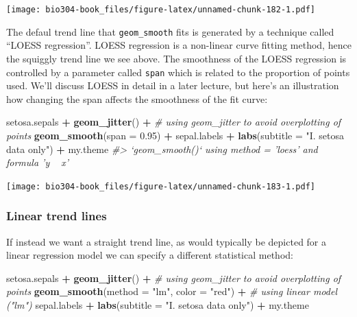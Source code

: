 \documentclass[]{book}
\newenvironment{Shaded}{\begin{snugshade}}{\end{snugshade}}
\newcommand{\CommentTok}[1]{\textcolor[rgb]{0.56,0.35,0.01}{\textit{#1}}}
\newcommand{\DataTypeTok}[1]{\textcolor[rgb]{0.13,0.29,0.53}{#1}}
\newcommand{\FloatTok}[1]{\textcolor[rgb]{0.00,0.00,0.81}{#1}}
\newcommand{\KeywordTok}[1]{\textcolor[rgb]{0.13,0.29,0.53}{\textbf{#1}}}
\newcommand{\NormalTok}[1]{#1}
\newcommand{\OperatorTok}[1]{\textcolor[rgb]{0.81,0.36,0.00}{\textbf{#1}}}
\newcommand{\StringTok}[1]{\textcolor[rgb]{0.31,0.60,0.02}{#1}}
\theoremstyle{definition}
\theoremstyle{definition}
\theoremstyle{definition}
\theoremstyle{remark}
\begin{document}
\texttt{[image: bio304-book\_files/figure-latex/unnamed-chunk-182-1.pdf]}

The defaul trend line that \texttt{geom\_smooth} fits is generated by a
technique called ``LOESS regression''. LOESS regression is a non-linear
curve fitting method, hence the squiggly trend line we see above. The
smoothness of the LOESS regression is controlled by a parameter called
\texttt{span} which is related to the proportion of points used. We'll
discuss LOESS in detail in a later lecture, but here's an illustration
how changing the span affects the smoothness of the fit curve:

\begin{Shaded}
\begin{Highlighting}[]
\NormalTok{setosa.sepals }\OperatorTok{+}\StringTok{ }
\StringTok{  }\KeywordTok{geom_jitter}\NormalTok{() }\OperatorTok{+}\StringTok{  }\CommentTok{# using geom_jitter to avoid overplotting of points}
\StringTok{  }\KeywordTok{geom_smooth}\NormalTok{(}\DataTypeTok{span =} \FloatTok{0.95}\NormalTok{) }\OperatorTok{+}
\StringTok{  }\NormalTok{sepal.labels }\OperatorTok{+}\StringTok{ }\KeywordTok{labs}\NormalTok{(}\DataTypeTok{subtitle =} \StringTok{"I. setosa data only"}\NormalTok{) }\OperatorTok{+}
\StringTok{  }\NormalTok{my.theme}
\CommentTok{#> `geom_smooth()` using method = 'loess' and formula 'y ~ x'}
\end{Highlighting}
\end{Shaded}

\texttt{[image: bio304-book\_files/figure-latex/unnamed-chunk-183-1.pdf]}

\hypertarget{linear-trend-lines}{%
\subsubsection{Linear trend lines}\label{linear-trend-lines}}

If instead we want a straight trend line, as would typically be depicted
for a linear regression model we can specify a different statistical
method:

\begin{Shaded}
\begin{Highlighting}[]
\NormalTok{setosa.sepals }\OperatorTok{+}\StringTok{ }
\StringTok{  }\KeywordTok{geom_jitter}\NormalTok{() }\OperatorTok{+}\StringTok{  }\CommentTok{# using geom_jitter to avoid overplotting of points}
\StringTok{  }\KeywordTok{geom_smooth}\NormalTok{(}\DataTypeTok{method =} \StringTok{"lm"}\NormalTok{, }\DataTypeTok{color =} \StringTok{"red"}\NormalTok{) }\OperatorTok{+}\StringTok{ }\CommentTok{# using linear model ("lm")}
\StringTok{  }\NormalTok{sepal.labels }\OperatorTok{+}\StringTok{ }\KeywordTok{labs}\NormalTok{(}\DataTypeTok{subtitle =} \StringTok{"I. setosa data only"}\NormalTok{) }\OperatorTok{+}
\StringTok{  }\NormalTok{my.theme}
\end{Highlighting}
\end{Shaded}
\end{document}
